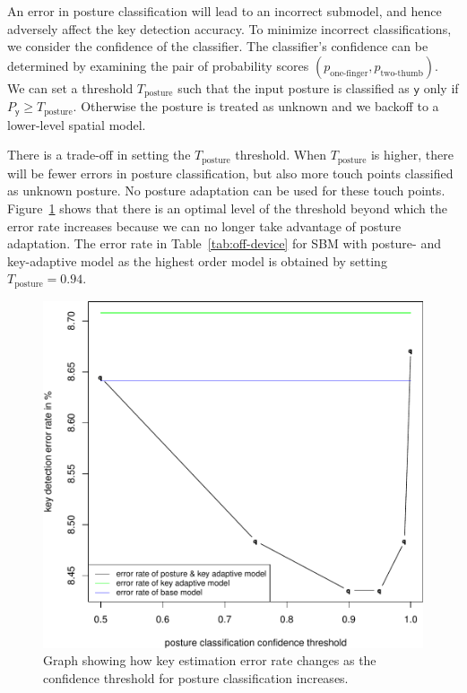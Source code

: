 \documentclass{sigchi}
\begin{document}
An error in posture classification will lead to an incorrect submodel,
and hence adversely affect the key detection accuracy. To minimize incorrect classifications, we consider the confidence of the classifier.  The classifier's confidence can be determined by examining the pair of probability 
scores $(p_{\text{one-finger}}, p_{\text{two-thumb}})$. 
We can set a threshold $T_{\text{posture}}$ such that the input posture is classified
as $\textsf{y}$ only if $P_\textsf{y} \ge T_{\text{posture}}$. Otherwise the posture is treated as
unknown and we backoff to a lower-level spatial model.

There is a trade-off in setting the $T_{\text{posture}}$ threshold. When
 $T_{\text{posture}}$ is higher, there will be fewer errors in posture classification, but also more touch points classified as unknown posture. No posture adaptation can be used for these touch points. Figure~\ref{fig:posture-confidence} 
 shows that there is an optimal level of the threshold beyond which the error rate
 increases because we can no longer take advantage of posture adaptation. The error rate in Table~\ref{tab:off-device} for SBM with posture- and key-adaptive model as the highest order model is obtained by setting $T_{\text{posture}} = 0.94$.

\begin{figure}[tb]
 \includegraphics[width=0.9\columnwidth]{figures/error-confidence-cropped.pdf}
  \caption{Graph showing how key estimation error rate changes as the confidence
  threshold for posture classification increases.}
  \label{fig:posture-confidence}
\end{figure}
\end{document}
